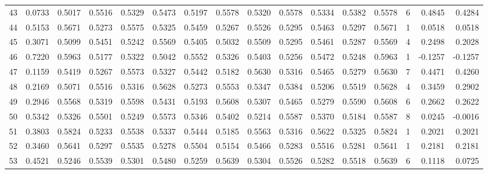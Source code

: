 \begin{tabular}{lrrrrrrrrrrrrrrr}
43  &      0.0733 &  0.5017 &  0.5516 &  0.5329 &  0.5473 &  0.5197 &  0.5578 &  0.5320 &  0.5578 &  0.5334 &   0.5382 &     0.5578 &      6 &                    0.4845 &                     0.4284 \\
44  &      0.5153 &  0.5671 &  0.5273 &  0.5575 &  0.5325 &  0.5459 &  0.5267 &  0.5526 &  0.5295 &  0.5463 &   0.5297 &     0.5671 &      1 &                    0.0518 &                     0.0518 \\
45  &      0.3071 &  0.5099 &  0.5451 &  0.5242 &  0.5569 &  0.5405 &  0.5032 &  0.5509 &  0.5295 &  0.5461 &   0.5287 &     0.5569 &      4 &                    0.2498 &                     0.2028 \\
46  &      0.7220 &  0.5963 &  0.5177 &  0.5322 &  0.5042 &  0.5552 &  0.5326 &  0.5403 &  0.5256 &  0.5472 &   0.5248 &     0.5963 &      1 &                   -0.1257 &                    -0.1257 \\
47  &      0.1159 &  0.5419 &  0.5267 &  0.5573 &  0.5327 &  0.5442 &  0.5182 &  0.5630 &  0.5316 &  0.5465 &   0.5279 &     0.5630 &      7 &                    0.4471 &                     0.4260 \\
48  &      0.2169 &  0.5071 &  0.5516 &  0.5316 &  0.5628 &  0.5273 &  0.5553 &  0.5347 &  0.5384 &  0.5206 &   0.5519 &     0.5628 &      4 &                    0.3459 &                     0.2902 \\
49  &      0.2946 &  0.5568 &  0.5319 &  0.5598 &  0.5431 &  0.5193 &  0.5608 &  0.5307 &  0.5465 &  0.5279 &   0.5590 &     0.5608 &      6 &                    0.2662 &                     0.2622 \\
50  &      0.5342 &  0.5326 &  0.5501 &  0.5249 &  0.5573 &  0.5346 &  0.5402 &  0.5214 &  0.5587 &  0.5370 &   0.5184 &     0.5587 &      8 &                    0.0245 &                    -0.0016 \\
51  &      0.3803 &  0.5824 &  0.5233 &  0.5538 &  0.5337 &  0.5444 &  0.5185 &  0.5563 &  0.5316 &  0.5622 &   0.5325 &     0.5824 &      1 &                    0.2021 &                     0.2021 \\
52  &      0.3460 &  0.5641 &  0.5297 &  0.5535 &  0.5278 &  0.5504 &  0.5154 &  0.5466 &  0.5283 &  0.5516 &   0.5281 &     0.5641 &      1 &                    0.2181 &                     0.2181 \\
53  &      0.4521 &  0.5246 &  0.5539 &  0.5301 &  0.5480 &  0.5259 &  0.5639 &  0.5304 &  0.5526 &  0.5282 &   0.5518 &     0.5639 &      6 &                    0.1118 &                     0.0725 \\

\end{tabular}
